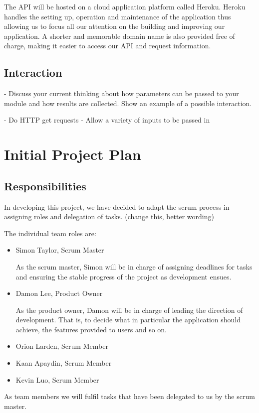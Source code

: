 \documentclass[a4paper, dvipsnames]{scrartcl}
\begin{document}
The API will be hosted on a cloud application platform called Heroku. Heroku handles the setting up, operation and maintenance of the application thus allowing us to focus all our attention on the building and improving our application. A shorter and memorable domain
name is also provided free of charge, making it easier to access our API and request information.

\subsection{Interaction}
- Discuss your current thinking about how 
parameters can be passed to your  module and how 
results are collected. Show an example of a possible interaction.

- Do HTTP get requests
- Allow a variety of inputs to be passed in

\section{Initial Project Plan}
\subsection{Responsibilities}
In developing this project, we have decided to adapt the scrum process in assigning roles and delegation of tasks. (change this, better wording)

The individual team roles are:
\begin{itemize}
\item
    Simon Taylor, Scrum Master
    
    As the scrum master, Simon will be in charge of assigning deadlines for tasks and ensuring the stable progress of the project as development ensues. 
\item    
    Damon Lee, Product Owner
    
    As the product owner, Damon will be in charge of leading the direction of development. That is, to decide what in particular the application should achieve, the features provided to users and so on.
\item   
    Orion Larden, Scrum Member
\item
    Kaan Apaydin, Scrum Member
\item
    Kevin Luo, Scrum Member
\end{itemize}
    
As team members we will fulfil tasks that have been delegated to us by the scrum master.
        
\end{document}
